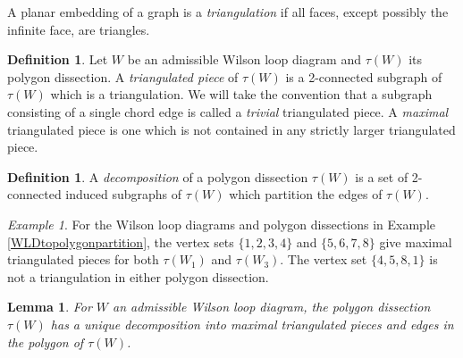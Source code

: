 \documentclass[11pt]{article}
\newtheorem{lem}[thm]{Lemma}
\theoremstyle{remark}
\newtheorem{eg}[thm]{Example}
\theoremstyle{definition}
\newtheorem{dfn}[thm]{Definition}
\begin{document}
A planar embedding of a graph is a \emph{triangulation} if all faces, except possibly the infinite face, are triangles.

\begin{dfn}
  Let $W$ be an admissible Wilson loop diagram and $\tau(W)$ its polygon dissection. A \emph{triangulated piece} of $\tau(W)$ is a 2-connected subgraph of $\tau(W)$ which is a triangulation. We will take the convention that a subgraph consisting of a single chord edge is called a \emph{trivial} triangulated piece.
A {\em maximal} triangulated piece is one which is not contained in any strictly larger triangulated piece.
\end{dfn}

\begin{dfn}
 A {\em decomposition} of a polygon dissection $\tau(W)$ is a set of 2-connected induced subgraphs of $\tau(W)$ which partition the edges of $\tau(W)$.  
\end{dfn}

\begin{eg} \label{eg: unique decomposition} For the Wilson loop diagrams and polygon dissections in Example \ref{WLDtopolygonpartition}, the vertex sets $\{1, 2, 3,4\}$ and $\{5, 6, 7, 8\}$ give maximal triangulated pieces for both $\tau(W_1)$ and $\tau(W_3)$. The vertex set $\{4,5, 8, 1\}$ is not a triangulation in either polygon dissection. 
\end{eg}

\begin{lem} \label{decompositionlem}
  For $W$ an admissible Wilson loop diagram, the polygon dissection $\tau(W)$ has a unique decomposition into maximal triangulated pieces and edges in the polygon of $\tau(W)$.
\end{lem}
\end{document}
